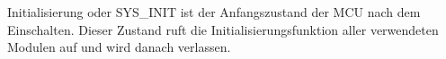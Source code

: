 Initialisierung oder SYS\_INIT ist der Anfangszustand der MCU nach dem Einschalten. Dieser Zustand ruft die Initialisierungsfunktion aller verwendeten Modulen auf und wird danach verlassen. 



